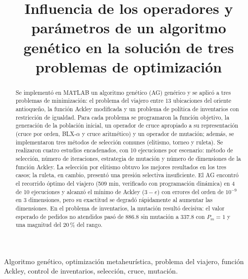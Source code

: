 \documentclass[conference]{IEEEtran}
\begin{document}
\title{Influencia de los operadores y par\'ametros de un algoritmo gen\'etico en la soluci\'on de tres problemas de optimizaci\'on}

\author{
}

\maketitle

\begin{abstract}
Se implement\'o en MATLAB un algoritmo gen\'etico (AG) gen\'erico y se aplic\'o a tres problemas de minimizaci\'on: el problema del viajero entre 13 ubicaciones del oriente antioque\~no, la funci\'on Ackley modificada y un problema de pol\'itica de inventarios con restricci\'on de igualdad. Para cada problema se programaron la funci\'on objetivo, la generaci\'on de la poblaci\'on inicial, un operador de cruce apropiado a su representaci\'on (cruce por orden, BLX-$\alpha$ y cruce aritm\'etico) y un operador de mutaci\'on; adem\'as, se implementaron tres m\'etodos de selecci\'on comunes (elitismo, torneo y ruleta). Se realizaron cuatro estudios encadenados, con 10 ejecuciones por escenario: m\'etodo de selecci\'on, n\'umero de iteraciones, estrategia de mutaci\'on y n\'umero de dimensiones de la funci\'on Ackley. La selecci\'on por elitismo obtuvo los mejores resultados en los tres casos; la ruleta, en cambio, present\'o una presi\'on selectiva insuficiente. El AG encontr\'o el recorrido \'optimo del viajero (509 min, verificado con programaci\'on din\'amica) en 4 de 10 ejecuciones y alcanz\'o el m\'inimo de Ackley ($3-e$) con errores del orden de $10^{-9}$ en 3 dimensiones, pero su exactitud se degrad\'o r\'apidamente al aumentar las dimensiones. En el problema de inventarios, la mutaci\'on result\'o decisiva: el valor esperado de pedidos no atendidos pas\'o de $886.8$ sin mutaci\'on a $337.8$ con $P_m=1$ y una magnitud del 20\,\% del rango.
\end{abstract}

\begin{IEEEkeywords}
Algoritmo gen\'etico, optimizaci\'on metaheur\'istica, problema del viajero, funci\'on Ackley, control de inventarios, selecci\'on, cruce, mutaci\'on.
\end{IEEEkeywords}
\end{document}
